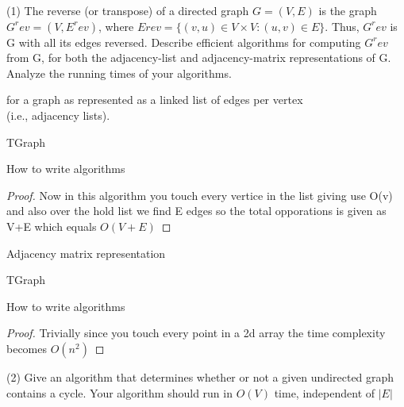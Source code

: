 \documentclass[12pt]{article}
\begin{document}
\maketitle
{}

(1) The reverse (or transpose) of a directed graph $G = (V, E)$ is the graph $G^rev = (V, E^rev)$,
where $Erev = \{ (v, u) \in V \times V : (u, v) \in E \}$. Thus, $G^rev$ is G with all its edges reversed.
Describe efficient algorithms for computing $G^rev$ from G, for both the adjacency-list and
adjacency-matrix representations of G. Analyze the running times of your algorithms.
\break

for a graph as represented as a linked list of edges per vertex \\
(i.e., adjacency lists).\\
\begin{algorithm}[H]
\SetAlgoLined
 TGraph\;
 \caption{How to write algorithms}
\end{algorithm}
\begin{proof}
Now in this algorithm you touch every vertice in the list giving use O(v) and also over the hold list we find E edges so the total opporations is given as V+E which equals $O(V+E)$

\end{proof}

Adjacency matrix representation \\
\begin{algorithm}[H]
\SetAlgoLined
 TGraph\;
 \caption{How to write algorithms}
\end{algorithm}
\begin{proof}
Trivially since you touch every point in a 2d array the time complexity becomes $O(n^2)$
\end{proof}



(2) Give an algorithm that determines whether or not a given undirected graph contains a
cycle. Your algorithm should run in $O(V )$ time, independent of $|E|$
\break
\end{document}
